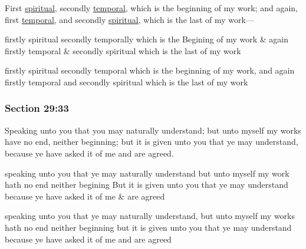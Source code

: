 		First \hyperref[SPIRITUAL]{spiritual}, secondly \hyperref[TEMPORAL]{temporal}, which is the beginning of my work; and again, first \hyperref[TEMPORAL]{temporal}, and secondly \hyperref[SPIRITUAL]{spiritual}, which is the last of my work---

		\begin{framed}
		\scriptsize
			\begin{compactdesc}
				\item[JSP] firstly spiritual secondly temporally which is the Begining of my work \& again firstly temporal \& secondly spiritual which is the last of my work
				\item[HSN] firstly spiritual secondly temporal which is the beginning of my work, and again firstly temporal and secondly spiritual which is the last of my work
			\end{compactdesc}
		\end{framed}

	\subsubsection{Section 29:33} %
		\label{DC29-33}

		Speaking unto you that you may naturally understand; but unto myself my works have no end, neither beginning; but it is given unto you that ye may understand, because ye have asked it of me and are agreed.

		\begin{framed}
		\scriptsize
			\begin{compactdesc}
				\item[JSP] speaking unto you that ye may naturally understand but unto myself my work hath no end neither begining But it is given unto you that ye may understand because ye have asked it of me \& are agreed
				\item[HSN] speaking unto you that ye may naturally understand, but unto myself my works hath no end neither beginning but it is given unto you that ye may understand because ye have asked it of me and are agreed
			\end{compactdesc}
		\end{framed}


